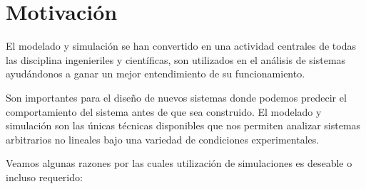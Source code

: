 \section{Motivación}
El modelado y simulación se han convertido en una actividad centrales de todas las disciplina ingenieriles y científicas, son utilizados en el análisis de sistemas  ayudándonos a ganar un mejor entendimiento de su funcionamiento. 

Son importantes para el diseño de nuevos sistemas donde podemos predecir el comportamiento del sistema antes de que sea construido.
El modelado y simulación son las únicas técnicas disponibles que nos permiten analizar sistemas arbitrarios no lineales bajo una variedad de condiciones experimentales.

Veamos algunas razones por las cuales utilización de simulaciones es deseable o incluso requerido:

